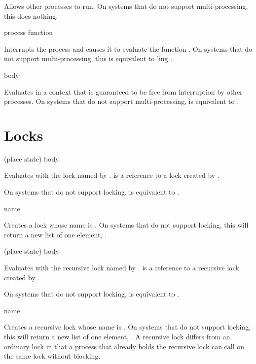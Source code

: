  {}

Allows other processes to run.  On systems that do not support multi-processing,
this does nothing.

 {process function}

Interrupts the process  and causes it to evaluate the function
.  On systems that do not support multi-processing, this is
equivalent to 'ing .

 {\body body}

Evaluates  in a context that is guaranteed to be free from
interruption by other processes.  On systems that do not support
multi-processing,  is equivalent to .


\section {Locks}

 {(place \optional state) \body body}

Evaluates  with the lock named by .   is a
reference to a lock created by .

On systems that do not support locking,  is equivalent to
.

 {\optional name}

Creates a lock whose name is .  On systems that do not support
locking, this will return a new list of one element, .

 {(place \optional state) \body body}

Evaluates  with the recursive lock named by .  
is a reference to a recursive lock created by .  

On systems that do not support locking,  is
equivalent to .

 {\optional name}

Creates a recursive lock whose name is .  On systems that do not
support locking, this will return a new list of one element, .  A
recursive lock differs from an ordinary lock in that a process that already
holds the recursive lock can call  on the same lock
without blocking.


